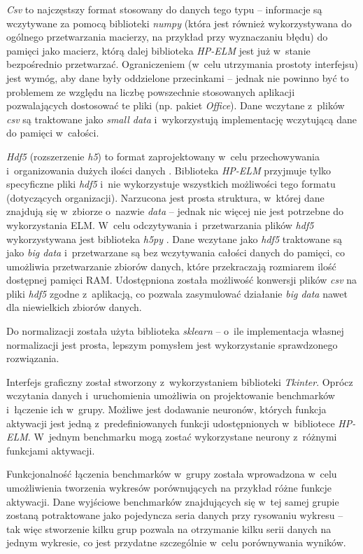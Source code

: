 \documentclass[pl]{minipw} %
\begin{document}
\textit{Csv} to najczęstszy format stosowany do danych tego typu -- informacje są wczytywane za pomocą biblioteki \textit{numpy} \cite{numpy} (która jest również wykorzystywana do ogólnego przetwarzania macierzy, na przykład przy wyznaczaniu błędu) do pamięci jako macierz, którą dalej biblioteka \textit{HP-ELM} jest już w~stanie bezpośrednio przetwarzać. Ograniczeniem (w~celu utrzymania prostoty interfejsu) jest wymóg, aby dane były oddzielone przecinkami -- jednak nie powinno być to problemem ze względu na liczbę powszechnie stosowanych aplikacji pozwalających dostosować te pliki (np. pakiet \textit{Office}). Dane wczytane z~plików \textit{csv} są traktowane jako \textit{small data} i~wykorzystują implementację wczytującą dane do pamięci w~całości. 

\textit{Hdf5} (rozszerzenie \textit{h5}) to format zaprojektowany w~celu przechowywania i~organizowania dużych ilości danych \cite{hdf5}. Biblioteka \textit{HP-ELM} przyjmuje tylko specyficzne pliki \textit{hdf5} i~nie wykorzystuje wszystkich możliwości tego formatu (dotyczących organizacji). Narzucona jest prosta struktura, w~której dane znajdują się w~zbiorze o~nazwie \textit{data} -- jednak nic więcej nie jest potrzebne do wykorzystania ELM. W~celu odczytywania i~przetwarzania plików \textit{hdf5} wykorzystywana jest biblioteka \textit{h5py} \cite{h5py}. Dane wczytane jako \textit{hdf5} traktowane są jako \textit{big data} i~przetwarzane są bez wczytywania całości danych do pamięci, co umożliwia przetwarzanie zbiorów danych, które przekraczają rozmiarem ilość dostępnej pamięci RAM. Udostępniona została możliwość konwersji plików \textit{csv} na pliki \textit{hdf5} zgodne z~aplikacją, co pozwala zasymulować działanie \textit{big data} nawet dla niewielkich zbiorów danych.  

Do normalizacji została użyta biblioteka \textit{sklearn} \cite{sklearn} -- o~ile implementacja własnej normalizacji jest prosta, lepszym pomysłem jest wykorzystanie sprawdzonego rozwiązania.

Interfejs graficzny został stworzony z~wykorzystaniem biblioteki \textit{Tkinter}. Oprócz wczytania danych i~uruchomienia umożliwia on projektowanie benchmarków i~łączenie ich w~grupy. Możliwe jest dodawanie neuronów, których funkcja aktywacji jest jedną z~predefiniowanych funkcji udostępnionych w~bibliotece \textit{HP-ELM}. W~jednym benchmarku mogą zostać wykorzystane neurony z~różnymi funkcjami aktywacji. 

Funkcjonalność łączenia benchmarków w~grupy została wprowadzona w~celu umożliwienia tworzenia wykresów porównujących na przykład różne funkcje aktywacji. Dane wyjściowe benchmarków znajdujących się w~tej samej grupie zostaną potraktowane jako pojedyncza seria danych przy rysowaniu wykresu -- tak więc stworzenie kilku grup pozwala na otrzymanie kilku serii danych na jednym wykresie, co jest przydatne szczególnie w~celu porównywania wyników. 
\end{document}
